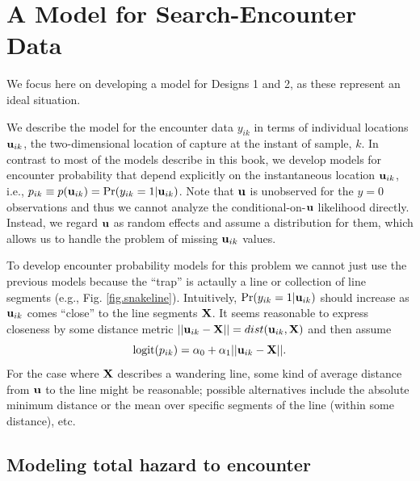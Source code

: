 \section{A Model for Search-Encounter Data}

We focus here on developing a model for Designs 1 and 2, as these
represent an ideal situation.

We describe the model for the encounter data $y_{ik}$ in terms of
individual locations ${\bf u}_{ik}$, the two-dimensional location of
capture at the instant of sample, $k$. In contrast to most of the
models describe in this book, we develop models for encounter
probability that depend explicitly on the instantaneous location ${\bf
  u}_{ik}$, i.e., $p_{ik} \equiv p({\bf u}_{ik}) = \Pr(y_{ik}=1|{\bf
  u}_{ik})$.  Note that ${\bf u}$ is unobserved for the $y=0$
observations and thus we cannot analyze the conditional-on-${\bf u}$
likelihood directly. Instead, we regard ${\bf u}$ as random effects
and assume a distribution for them, which allows us to handle the
problem of missing ${\bf u}_{ik}$ values.

To develop encounter probability models for this problem we cannot
just use the previous models because the ``trap'' is actaully a line
or collection of line segments (e.g., Fig. \ref{fig.snakeline}).
Intuitively, $\Pr(y_{ik}=1|{\bf u}_{ik})$ should increase as ${\bf
  u}_{ik}$ comes ``close'' to the line segments ${\bf X}$. It seems
reasonable to express closeness by some distance metric $|| {\bf
  u}_{ik} - {\bf X} || = dist( {\bf u}_{ik}, {\bf X})$ and then assume
\[
\mbox{logit}(p_{ik}) = \alpha_{0} + \alpha_{1} || {\bf u}_{ik} - {\bf X} ||.
\]
For the case where ${\bf X}$ describes a wandering line, some
kind of average distance from ${\bf u}$ to the line
might be reasonable; possible alternatives include the absolute
minimum distance or the mean over specific segments
of the line (within some distance), etc. 

\subsection{Modeling total hazard to encounter}

